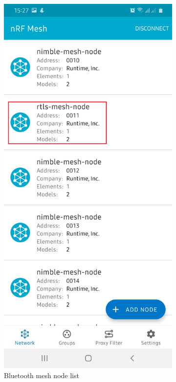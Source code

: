 \documentclass[\main/main.tex]{subfiles}
\begin{document}
\begin{figure}[H]
    \centering
    \begin{subfigure}[b]{0.4\linewidth}
        \centering
        \includegraphics[width=0.65\linewidth]{nRF_Mesh_04.jpg}
        \caption{Bluetooth mesh node list}
        \label{fig:bluetooth_mesh_node_list}
    \end{subfigure}
    \begin{subfigure}[b]{0.4\linewidth}
        \centering

\end{subfigure}
\end{figure}
\end{document}
